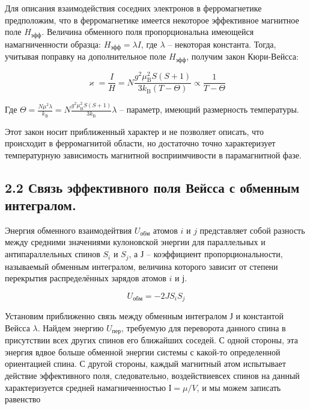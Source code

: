 \documentclass[a4paper,12pt]{report}
\begin{document}
Для описания взаимодействия соседних электронов в ферромагнетике предположим, что в ферромагнетике имеется некоторое эффективное магнитное поле $H_{\text {эфф}}$. Величина обменного поля пропорциональна имеющейся намагниченности образца: $H_{\text{эфф}} = \lambda I$, где $\lambda$ -- некоторая константа. Тогда, учитывая поправку на дополнительное поле $H_{\text{эфф}}$, получим закон Кюри-Вейсса:

\begin{equation}\label{C-W}
    \varkappa=\frac{I}{H}=N \frac{g^{2} \mu_{\mathrm{B}}^{2} S(S+1)}{3 k_{\mathrm{B}}(T-\Theta)} \propto \frac{1}{T-\Theta}
\end{equation}

Где $\Theta=\frac{N \mu^{2} \lambda}{k_{\mathrm{B}}}=N \frac{g^{2} \mu_{\mathrm{B}}^{2} S(S+1)}{3 k_{\mathrm{B}}} \lambda$ -- параметр, имеющий размерность температуры.

Этот закон носит приближенный характер и не позволяет описать, что происходит в ферромагнитой области, но достаточно точно характеризует температурную зависимость магнитной восприимчивости в парамагнитной фазе. 

\subsection*{2.2 Связь эффективного поля Вейсса с обменным интегралом.}

Энергия обменного взаимодейтвия $U_\text{обм}$ атомов $i$ и $j$ представляет собой разность между средними значениями кулоновской энергии для параллельных и антипараллельных спинов $S_i$ и $S_j$, а $Ј$ -- коэффициент пропорциональности, называемый обменным интегралом, величина которого зависит от степени перекрытия распределённых зарядов атомов $i$ и $ј$.

\begin{equation}\label{energy}
    U_\text{обм} = -2 J S_i S_j
\end{equation}

Установим приближенно связь между обменным интегралом $Ј$ и константой Вейсса $\lambda$. Найдем энергию $U_\text{пер}$, требуемую для переворота данного спина в присутствии всех других спинов его ближайших соседей. С одной стороны, эта энергия вдвое больше обменной энергии системы с какой-то определенной ориентацией спина. С другой стороны, каждый магнитный атом испытывает действие эффективного поля, следовательно, воздействиевсех спинов на данный характеризуется средней намагниченностью $І=\mu/V$, и мы можем записать равенство
\end{document}
